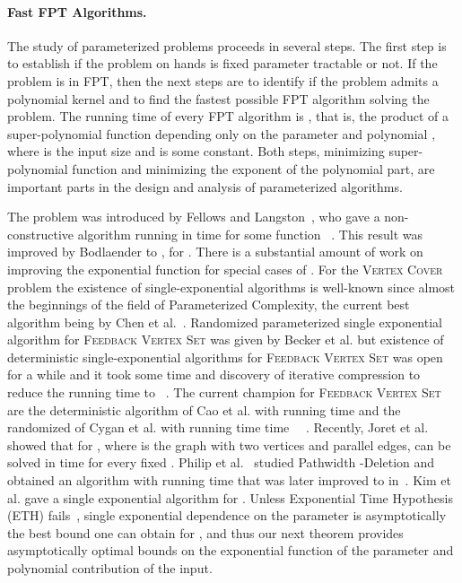 \paragraph{Fast FPT Algorithms.} 
The study of parameterized problems proceeds in several steps. The first step is to establish if the  problem on hands is fixed parameter tractable or not. If the problem is in FPT, then the next steps are to identify if the problem admits a polynomial kernel and to find the fastest possible FPT algorithm solving the problem. 
The running time  of every FPT algorithm is   , that is, the product of a super-polynomial function  depending only on the parameter  and polynomial , where  is the input size and  is some constant.  Both steps, minimizing super-polynomial function  and minimizing  the exponent
 of the polynomial part, are important parts in the design and analysis of parameterized algorithms. 

 The \fd{} problem was introduced by Fellows and Langston~\cite{FellowsL88}, who gave a
non-constructive algorithm running in time  for some function
~\cite[Theorem ]{FellowsL88}.  This result was improved by Bodlaender
\cite{Bodlaender97} to  ,  for  . 
There is a substantial amount of  work  on  improving the exponential function  for special cases of  \fd{}.
For the \textsc{Vertex Cover} problem
the existence of single-exponential algorithms is well-known
since almost the beginnings of the field of Parameterized
Complexity, the current best algorithm being by
Chen et al.~\cite{ChenKX10}. Randomized parameterized single exponential algorithm for 
\textsc{Feedback Vertex Set} was given by Becker et al.
\cite{BeckerBRG00-Ra} but 
   existence of deterministic single-exponential algorithms for
\textsc{Feedback Vertex Set} was open for a while and it took some time and 
discovery of iterative compression  \cite{ReedSmithVetta04}
 to reduce the running time to  ~\cite{CaoCL10,ChenFLLV08,CNP+11,DehneFLRS07,GuoGHNW06,RamanSS06}.  The current  champion for
\textsc{Feedback Vertex Set} are the deterministic algorithm of 
Cao et al.  \cite{CaoCL10} with running time  and the randomized of Cygan et al.
with running time time~ ~\cite{CNP+11}. Recently, Joret et al.~\cite{JoretPSST11} showed 
that  \fd{} for , where   is the graph with two vertices and  parallel edges,     can be solved in time  for 
every fixed . Philip et al.~\cite{PhilipRV10} studied {\sc Pathwidth -Deletion} 
and obtained an algorithm with running time  that was later improved to  in~\cite{CyganPPW10}.
Kim et al. \cite{KimPG12} gave a single exponential algorithm for  .  Unless Exponential Time Hypothesis (ETH) fails~\cite{CCF+05,ImpagliazzoPZ01}, single exponential dependence on the parameter  is asymptotically the best bound one can obtain for \fd{}, and thus our next theorem provides asymptotically  optimal bounds on the exponential function of the parameter   and polynomial contribution of the input. 

